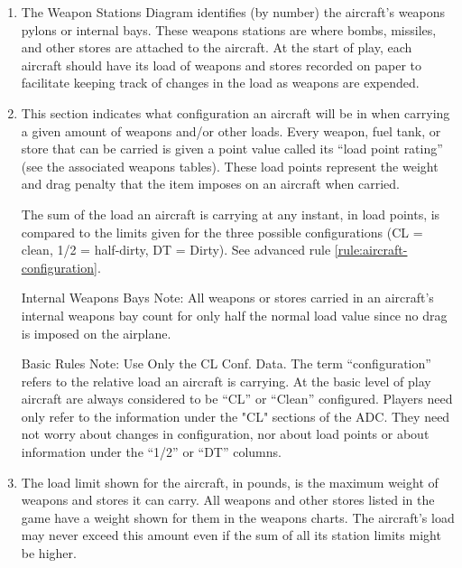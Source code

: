 \begin{enumerate}[resume]
    \item {}
        The Weapon Stations Diagram identifies (by number) the aircraft's weapons pylons or internal bays. These weapons stations are where bombs, missiles, and other stores are attached to the aircraft. At the start of play, each aircraft should have its load of weapons and stores recorded on paper to facilitate keeping track of changes in the load as weapons are expended.

    \item {}
        This section indicates what configuration an aircraft will be in when carrying a given amount of weapons and/or other loads. Every weapon, fuel tank, or store that can be carried is given a point value called its “load point rating” (see the associated weapons tables). These load points represent the weight and drag penalty that the item imposes on an aircraft when carried.

        The sum of the load an aircraft is carrying at any instant, in load points, is compared to the limits given for the three possible configurations (CL = clean, 1/2 = half-dirty, DT = Dirty).  See advanced rule \ref{rule:aircraft-configuration}.

        Internal Weapons Bays Note: All weapons or stores carried in an aircraft's internal weapons bay count for only half the normal load value since no drag is imposed on the airplane.

        Basic Rules Note:  Use Only the CL Conf. Data. The term “configuration” refers to the relative load an aircraft is carrying. At the basic level of play aircraft are always considered to be “CL” or “Clean” configured. Players need only refer to the information under the "CL" sections of the ADC. They need not worry about changes in configuration, nor about load points or about information under the “1/2” or “DT” columns.

    \item {}
        The load limit shown for the aircraft, in pounds, is the maximum weight of weapons and stores it can carry. All weapons and other stores listed in the game have a weight shown for them in the weapons charts. The aircraft's load may never exceed this amount even if the sum of all its station limits might be higher.


\end{enumerate}
